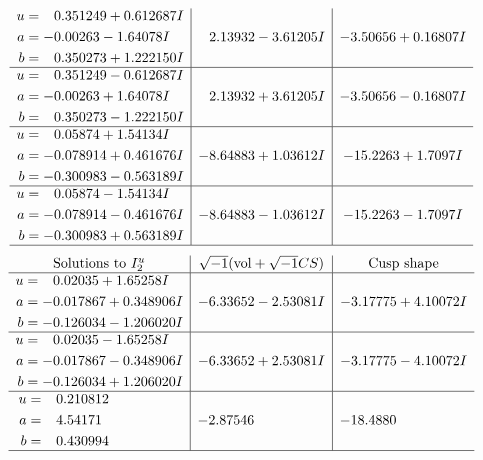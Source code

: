\documentclass[1p]{elsarticle_modified}
\theoremstyle{definition}
\newcommand{\I}{\sqrt{-1}}
\begin{document}
$$\begin{array}{c|c|c}
\begin{aligned}
u &= \phantom{-}0.351249 + 0.612687 I \\
a &= -0.00263 - 1.64078 I \\
b &= \phantom{-}0.350273 + 1.222150 I\end{aligned}
 & \phantom{-}2.13932 - 3.61205 I & -3.50656 + 0.16807 I \\ \hline\begin{aligned}
u &= \phantom{-}0.351249 - 0.612687 I \\
a &= -0.00263 + 1.64078 I \\
b &= \phantom{-}0.350273 - 1.222150 I\end{aligned}
 & \phantom{-}2.13932 + 3.61205 I & -3.50656 - 0.16807 I \\ \hline\begin{aligned}
u &= \phantom{-}0.05874 + 1.54134 I \\
a &= -0.078914 + 0.461676 I \\
b &= -0.300983 - 0.563189 I\end{aligned}
 & -8.64883 + 1.03612 I & -15.2263 + 1.7097 I \\ \hline\begin{aligned}
u &= \phantom{-}0.05874 - 1.54134 I \\
a &= -0.078914 - 0.461676 I \\
b &= -0.300983 + 0.563189 I\end{aligned}
 & -8.64883 - 1.03612 I & -15.2263 - 1.7097 I\\
 \hline 
 \end{array}$$\newpage$$\begin{array}{c|c|c}  
\text{Solutions to }I^u_{2}& \I (\text{vol} + \sqrt{-1}CS) & \text{Cusp shape}\\
 \hline 
\begin{aligned}
u &= \phantom{-}0.02035 + 1.65258 I \\
a &= -0.017867 + 0.348906 I \\
b &= -0.126034 - 1.206020 I\end{aligned}
 & -6.33652 - 2.53081 I & -3.17775 + 4.10072 I \\ \hline\begin{aligned}
u &= \phantom{-}0.02035 - 1.65258 I \\
a &= -0.017867 - 0.348906 I \\
b &= -0.126034 + 1.206020 I\end{aligned}
 & -6.33652 + 2.53081 I & -3.17775 - 4.10072 I \\ \hline\begin{aligned}
u &= \phantom{-}0.210812\phantom{ +0.000000I} \\
a &= \phantom{-}4.54171\phantom{ +0.000000I} \\
b &= \phantom{-}0.430994\phantom{ +0.000000I}\end{aligned}
 & -2.87546\phantom{ +0.000000I} & -18.4880\phantom{ +0.000000I}\\
 \hline 
 \end{array}$$\newpage
\end{document}
